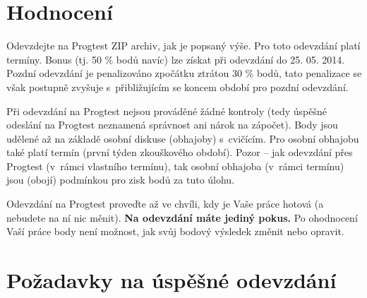 \documentclass[a4paper,11pt]{article}
\begin{document}
\section{Hodnocení}

Odevzdejte na Progtest ZIP archiv, jak je popsaný výše. Pro toto odevzdání platí termíny. Bonus (tj. 50 \% bodů navíc) lze získat při odevzdání do 25. 05. 2014. Pozdní odevzdání je penalizováno zpočátku ztrátou 30 \% bodů, tato penalizace se však postupně zvyšuje s~přibližujícím se koncem období pro pozdní odevzdání.

Při odevzdání na Progtest nejsou prováděné žádné kontroly (tedy úspěšné odeslání na Progtest neznamená správnost ani nárok na zápočet). Body jsou udělené až na základě osobní diskuse (obhajoby) s~cvičícím. Pro osobní obhajobu také platí termín (první týden zkouškového období). Pozor -- jak odevzdání přes Progtest (v~rámci vlastního termínu), tak osobní obhajoba (v~rámci termínu) jsou (obojí) podmínkou pro zisk bodů za tuto úlohu.

Odevzdání na Progtest proveďte až ve chvíli, kdy je Vaše práce hotová (a nebudete na ní nic měnit). \textbf{Na odevzdání máte jediný pokus.} Po ohodnocení Vaší práce body není možnost, jak svůj bodový výsledek změnit nebo opravit.

\section{Požadavky na úspěšné odevzdání}
\end{document}
